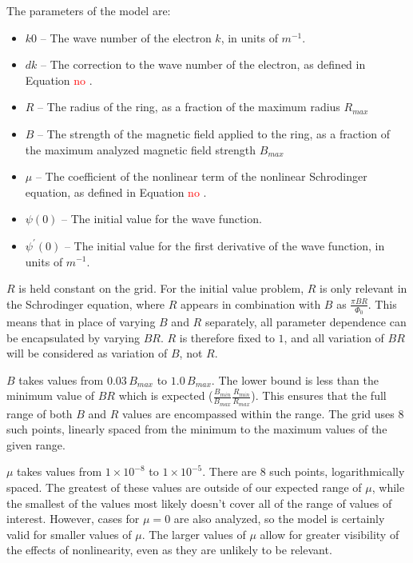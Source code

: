 \documentclass[A4,12pt,oneside]{article}
\renewcommand{\(}{\left(}
\renewcommand{\)}{\right)}
\newcommand{\refph}{\textcolor{red}{no }}
\begin{document}
The parameters of the model are:
\begin{itemize}
\item $k0$ -- The wave number of the electron $k$, in units of $m^{-1}$.
\item $dk$ -- The correction to the wave number of the electron, as defined in Equation \refph .
\item $R$ -- The radius of the ring, as a fraction of the maximum radius $R_{max}$
\item $B$ -- The strength of the magnetic field applied to the ring, as a fraction of the maximum analyzed magnetic field strength $B_{max}$
\item $\mu$ -- The coefficient of the nonlinear term of the nonlinear Schrodinger equation, as defined in Equation \refph .
\item $\psi\left(0\right)$ -- The initial value for the wave function. 
\item $\psi^\prime\left(0\right)$ -- The initial value for the first derivative of the wave function, in units of $m^{-1}$.
\end{itemize}

$R$ is held constant on the grid. For the initial value problem, $R$ is only relevant in the Schrodinger equation, where $R$ appears in combination with $B$ as $\frac{\pi BR}{\Phi_0}$. This means that in place of varying $B$ and $R$ separately, all parameter dependence can be encapsulated by varying $B R$. $R$ is therefore fixed to $1$, and all variation of $B R$ will be considered as variation of $B$, not $R$. 

$B$ takes values from $0.03\,B_{max}$ to $1.0\,B_{max}$. The lower bound is less than the minimum value of $BR$ which is expected ($\frac{B_{min}}{B_{max}}\frac{R_{min}}{R_{max}}$). This ensures that the full range of both $B$ and $R$ values are encompassed within the range. The grid uses $8$ such points, linearly spaced from the minimum to the maximum values of the given range.

$\mu$ takes values from $1\times10^{-8}$ to $1\times10^{-5}$. There are $8$ such points, logarithmically spaced. The greatest of these values are outside of our expected range of $\mu$, while the smallest of the values most likely doesn't cover all of the range of values of interest. However, cases for $\mu = 0$ are also analyzed, so the model is certainly valid for smaller values of $\mu$. The larger values of $\mu$ allow for greater visibility of the effects of nonlinearity, even as they are unlikely to be relevant.
 
\end{document}
